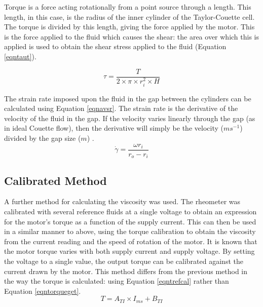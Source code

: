 \documentclass[twoside,a4]{report}
\def\br{\newline \newline \noindent}
\begin{document}
	Torque is a force acting rotationally from a point source through a length. This length, in this case, is the radius of the inner cylinder of the Taylor-Couette cell. The torque is divided by this length, giving the force applied by the motor. This is the force applied to the fluid which causes the shear: the area over which this is applied is used to obtain the shear stress applied to the fluid (Equation \ref{eqntaut}).
	
	\begin{equation}
	\tau = \frac{T}{2 \times \pi \times r_i^2 \times H}
	\label{eqntaut}
	\end{equation}
	
	
	\noindent
	The strain rate imposed upon the fluid in the gap between the cylinders can be calculated using Equation \ref{eqnavsr}. The strain rate is the derivative of the velocity of the fluid in the gap. If the velocity varies linearly through the gap (as in ideal Couette flow), then the derivative will simply be the velocity ($ms^{-1}$) divided by the gap size ($m$) \cite{couetteshearcell}.
	\begin{equation}
	\dot{\gamma} = \frac{\omega r_i}{r_o - r_i}
	\label{eqnavsr}
	\end{equation}
	
	
	\subsection*{Calibrated Method}
	A further method for calculating the viscosity was used. The rheometer was calibrated with several reference fluids at a single voltage to obtain an expression for the motor's torque as a function of the supply current. This can then be used in a similar manner to above, using the torque calibration to obtain the viscosity from the current reading and the speed of rotation of the motor.
	\br
	It is known that the motor torque varies with both supply current and supply voltage. By setting the voltage to a single value, the output torque can be calibrated against the current drawn by the motor. This method differs from the previous method in the way the torque is calculated: using Equation \ref{eqntrefcal} rather than Equation \ref{eqntorqueget}.
	\begin{equation}
	T = A_{TI} \times I_{ms} + B_{TI}
	\label{eqntrefcal}
	\end{equation}
\end{document}
